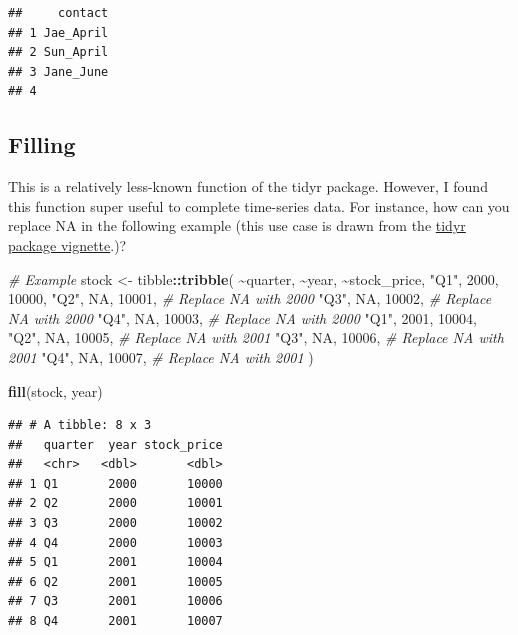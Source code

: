 \documentclass[
]{book}
\newenvironment{Shaded}{\begin{snugshade}}{\end{snugshade}}
\newcommand{\CommentTok}[1]{\textcolor[rgb]{0.56,0.35,0.01}{\textit{#1}}}
\newcommand{\ConstantTok}[1]{\textcolor[rgb]{0.56,0.35,0.01}{#1}}
\newcommand{\DecValTok}[1]{\textcolor[rgb]{0.00,0.00,0.81}{#1}}
\newcommand{\FunctionTok}[1]{\textcolor[rgb]{0.13,0.29,0.53}{\textbf{#1}}}
\newcommand{\NormalTok}[1]{#1}
\newcommand{\OtherTok}[1]{\textcolor[rgb]{0.56,0.35,0.01}{#1}}
\newcommand{\SpecialCharTok}[1]{\textcolor[rgb]{0.81,0.36,0.00}{\textbf{#1}}}
\newcommand{\StringTok}[1]{\textcolor[rgb]{0.31,0.60,0.02}{#1}}
\begin{document}
\begin{verbatim}
##     contact
## 1 Jae_April
## 2 Sun_April
## 3 Jane_June
## 4
\end{verbatim}

\subsection{Filling}\label{filling}

This is a relatively less-known function of the tidyr package. However, I found this function super useful to complete time-series data. For instance, how can you replace NA in the following example (this use case is drawn from the \href{https://tidyr.tidyverse.org/reference/fill.html}{tidyr package vignette}.)?

\begin{Shaded}
\begin{Highlighting}[]
\CommentTok{\# Example}
\NormalTok{stock }\OtherTok{\textless{}{-}}\NormalTok{ tibble}\SpecialCharTok{::}\FunctionTok{tribble}\NormalTok{(}
  \SpecialCharTok{\textasciitilde{}}\NormalTok{quarter, }\SpecialCharTok{\textasciitilde{}}\NormalTok{year, }\SpecialCharTok{\textasciitilde{}}\NormalTok{stock\_price,}
  \StringTok{"Q1"}\NormalTok{, }\DecValTok{2000}\NormalTok{, }\DecValTok{10000}\NormalTok{,}
  \StringTok{"Q2"}\NormalTok{, }\ConstantTok{NA}\NormalTok{, }\DecValTok{10001}\NormalTok{, }\CommentTok{\# Replace NA with 2000}
  \StringTok{"Q3"}\NormalTok{, }\ConstantTok{NA}\NormalTok{, }\DecValTok{10002}\NormalTok{, }\CommentTok{\# Replace NA with 2000}
  \StringTok{"Q4"}\NormalTok{, }\ConstantTok{NA}\NormalTok{, }\DecValTok{10003}\NormalTok{, }\CommentTok{\# Replace NA with 2000}
  \StringTok{"Q1"}\NormalTok{, }\DecValTok{2001}\NormalTok{, }\DecValTok{10004}\NormalTok{,}
  \StringTok{"Q2"}\NormalTok{, }\ConstantTok{NA}\NormalTok{, }\DecValTok{10005}\NormalTok{, }\CommentTok{\# Replace NA with 2001}
  \StringTok{"Q3"}\NormalTok{, }\ConstantTok{NA}\NormalTok{, }\DecValTok{10006}\NormalTok{, }\CommentTok{\# Replace NA with 2001}
  \StringTok{"Q4"}\NormalTok{, }\ConstantTok{NA}\NormalTok{, }\DecValTok{10007}\NormalTok{, }\CommentTok{\# Replace NA with 2001}
\NormalTok{)}

\FunctionTok{fill}\NormalTok{(stock, year)}
\end{Highlighting}
\end{Shaded}

\begin{verbatim}
## # A tibble: 8 x 3
##   quarter  year stock_price
##   <chr>   <dbl>       <dbl>
## 1 Q1       2000       10000
## 2 Q2       2000       10001
## 3 Q3       2000       10002
## 4 Q4       2000       10003
## 5 Q1       2001       10004
## 6 Q2       2001       10005
## 7 Q3       2001       10006
## 8 Q4       2001       10007
\end{verbatim}
\end{document}
